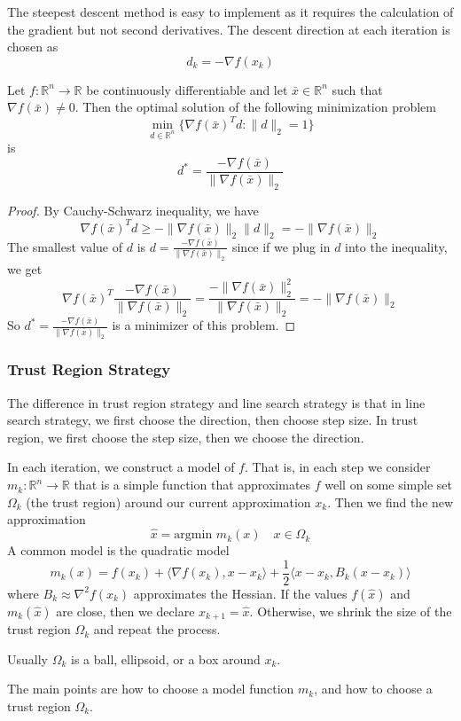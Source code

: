 The steepest descent method is easy to implement as it requires the calculation of the gradient but not second derivatives. The descent direction at each iteration is chosen as $$d_k = - \nabla f(x_k)$$
\begin{lemma}
  Let $f: \mathbb R^n \to \mathbb R$ be continuously differentiable and let $\bar x \in \mathbb R^n$ such that $\nabla f(\bar x) \neq 0$. Then the optimal solution of the following minimization problem $$\min_{d \in \mathbb R^n} \{\nabla f(\bar x)^T d: \|d\|_2 = 1\}$$ is $$d^* = \frac{-\nabla f(\bar x)}{\|\nabla f(\bar x)\|_2}$$
\end{lemma}
\begin{proof}[Proof]
  By Cauchy-Schwarz inequality, we have
  $$\nabla f(\bar x)^T d \geq -\| \nabla f(\bar x)\|_2 \| d\|_2 = -\|\nabla f(\bar x)\|_2$$
  The smallest value of $d$ is $d = \frac{-\nabla f(\bar x)}{\|\nabla f(\bar x)\|_2}$ since if we plug in $d$ into the inequality, we get
  $$\nabla f(\bar x)^T \frac{-\nabla f(\bar x)}{\|\nabla f(\bar x)\|_2} = \frac{-\|\nabla f(\bar x)\|^2_2}{\|\nabla f(\bar x)\|_2}=-\|\nabla f(\bar x)\|_2$$
  So $d^* = \frac{-\nabla f(\bar x)}{\|\nabla f(\bar x)\|_2}$ is a minimizer of this problem.
\end{proof}
\subsubsection{Trust Region Strategy}
The difference in trust region strategy and line search strategy is that in line search strategy, we first choose the direction, then choose step size. In trust region, we first choose the step size, then we choose the direction.
\begin{definition}
  In each iteration, we construct a model of $f$. That is, in each step we consider $m_k: \mathbb R^n \to \mathbb R$ that is a simple function that approximates $f$ well on some simple set $\Omega_k$ (the trust region) around our current approximation $x_k$. Then we find the new approximation $$\hat x = \text{argmin } m_k(x) \quad \text{$x \in \Omega_k$}$$
  A common model is the quadratic model $$m_k(x) = f(x_k) + \langle \nabla f(x_k), x - x_k \rangle + \frac{1}{2} \langle x - x_k, B_k(x - x_k) \rangle$$ where $B_k \approx \nabla^2 f(x_k)$ approximates the Hessian. If the values $f(\hat x)$ and $m_k(\hat x)$ are close, then we declare $x_{k+1} = \hat x$. Otherwise, we shrink the size of the trust region $\Omega_k$ and repeat the process.

  Usually $\Omega_k$ is a ball, ellipsoid, or a box around $x_k$.

  The main points are how to choose a model function $m_k$, and how to choose a trust region $\Omega_k$.
\end{definition}

